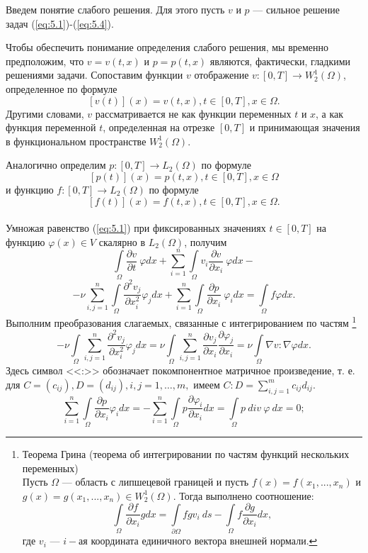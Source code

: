 Введем понятие слабого решения. Для этого пусть $v$ и $p$ --- сильное решение задач (\ref{eq:5.1})-(\ref{eq:5.4}).

Чтобы обеспечить понимание определения слабого решения, мы временно предположим, что $v=v(t, x)$ и $p=p(t, x)$ являются, фактически, гладкими решениями задачи.
Сопоставим функции $v$ отображение $v:[0, T]\rightarrow W^1_2(\Omega)$, определенное по формуле $$[v(t)](x)=v(t, x), t\in[0, T], x\in\Omega.$$
Другими словами, $v$ рассматривается не как функции переменных $t$ и $x$, а как функция переменной $t$, определенная на отрезке
$[0, T]$ и принимающая значения в функциональном пространстве $W^1_2(\Omega)$.

Аналогично определим $p:[0, T]\rightarrow L_2(\Omega)$ по формуле $$[p(t)](x)=p(t, x), t\in[0, T], x\in\Omega$$
и функцию $f:[0, T]\rightarrow L_2(\Omega)$ по формуле $$[f(t)](x)=f(t, x), t\in[0, T], x\in\Omega.$$\\

Умножая равенство (\ref{eq:5.1}) при фиксированных значениях $t\in [0, T]$ на функцию $\varphi (x)\in V$ скалярно в $L_2(\Omega)$, получим
$$\int\limits_\Omega \frac{\partial v}{\partial t}\ \varphi dx+\sum_{i=1}^n\int\limits_\Omega v_i\frac{\partial v}{\partial x_i}\ \varphi dx-$$
$$-\nu \sum_{i, j=1}^n\int\limits_\Omega\frac{\partial^2 v_j}{\partial x^{2}_i} \varphi_j dx+
\sum_{i=1}^n\int\limits_\Omega \frac{\partial p}{\partial x_i}\ \varphi_idx=\int\limits_\Omega f\varphi dx.$$
Выполним преобразования слагаемых, связанные с интегрированием по частям
\footnote{Теорема Грина (теорема об интегрировании по частям функций нескольких переменных)\\
 Пусть $\Omega$ --- область с липшецевой границей и пусть $f(x)=f(x_1,...,x_n)$ и $g(x)=g(x_1,...,x_n)\in W_2^1(\Omega).$
 Тогда выполнено соотношение:
 $$\int\limits_\Omega\frac{\partial f}{\partial x_i} gdx=\int\limits_{\partial\Omega} fgv_i \ ds-\int\limits_\Omega f \frac{\partial g}{\partial x_i} dx,$$
 где $v_i$ --- $i-$ая координата единичного вектора внешней нормали.
}
$$-\nu\int\limits_\Omega \sum_{i,j=1}^{n}\frac{\partial^2 v_j}{\partial x^{2}_i}\varphi_j dx=
\nu\int\limits_\Omega\sum_{i, j=1}^{n}\frac{\partial v_j}{\partial x_i}\frac{\partial \varphi_j}{\partial x_i}=\nu\int\limits_\Omega \nabla v:\nabla\varphi dx.$$
Здесь символ <<:>> обозначает покомпонентное матричное произведение, т. е. для $ C=(c_{ij}), D=(d_{ij}), i, j=1,\ldots,m,$ имеем $C:D=\sum\limits_{i,j=1}^{m} c_{ij}d_{ij}.$
$$\sum_{i=1}^{n}\int\limits_\Omega \frac{\partial p}{\partial x_i}\varphi_i dx
=-\sum_{i=1}^{n}\int\limits_\Omega p\frac{\partial \varphi_i}{\partial x_i}dx= \int\limits_\Omega p \ div \ \varphi \ dx=0;$$

